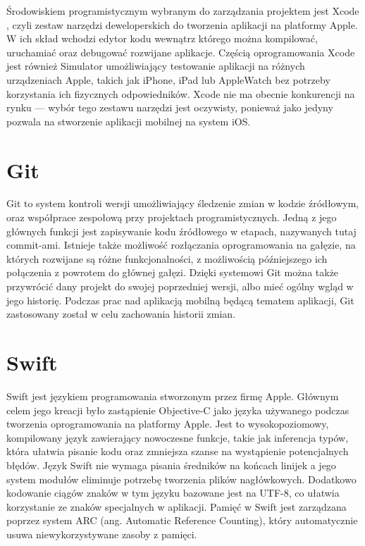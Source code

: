 \documentclass[final,a4paper,openany,12pt]{mwbk}
\begin{document}
Środowiskiem programistycznym wybranym do zarządzania projektem jest Xcode \cite{apple_xcode}, czyli zestaw narzędzi deweloperskich do tworzenia aplikacji na platformy Apple. W ich skład wchodzi edytor kodu wewnątrz którego można kompilować, uruchamiać oraz debugować rozwijane aplikacje. Częścią oprogramowania Xcode jest również Simulator umożliwiający testowanie aplikacji na różnych urządzeniach Apple, takich jak iPhone, iPad lub AppleWatch bez potrzeby korzystania ich fizycznych odpowiedników. Xcode nie ma obecnie konkurencji na rynku --- wybór tego zestawu narzędzi jest oczywisty, ponieważ jako jedyny pozwala na stworzenie aplikacji mobilnej na system iOS. 


\section{Git}

Git \cite{git_book} to system kontroli wersji umożliwiający śledzenie zmian w kodzie źródłowym, oraz współprace zespołową przy projektach programistycznych. Jedną z jego głównych funkcji jest zapisywanie kodu źródłowego w etapach, nazywanych tutaj commit-ami. Istnieje także możliwość rozłączania oprogramowania na gałęzie, na których rozwijane są różne funkcjonalności, z możliwością późniejszego ich połączenia z powrotem do głównej gałęzi. Dzięki systemowi Git można także przywrócić dany projekt do swojej poprzedniej wersji, albo mieć ogólny wgląd w jego historię. Podczas prac nad aplikacją mobilną będącą tematem aplikacji, Git zastosowany został w celu zachowania historii zmian.


\section{Swift}

Swift \cite{swift_apple_developer} jest językiem programowania stworzonym przez firmę Apple. Głównym celem jego kreacji było zastąpienie Objective-C jako języka używanego podczas tworzenia oprogramowania na platformy Apple. Jest to wysokopoziomowy, kompilowany język zawierający nowoczesne funkcje, takie jak inferencja typów, która ułatwia pisanie kodu oraz zmniejsza szanse na wystąpienie potencjalnych błędów. Język Swift nie wymaga pisania średników na końcach linijek a jego system modułów eliminuje potrzebę tworzenia plików nagłówkowych. Dodatkowo kodowanie ciągów znaków w tym języku bazowane jest na UTF-8, co ułatwia korzystanie ze znaków specjalnych w aplikacji. Pamięć w Swift jest zarządzana poprzez system ARC (ang. Automatic Reference Counting), który automatycznie usuwa niewykorzystywane zasoby z pamięci.
\end{document}
